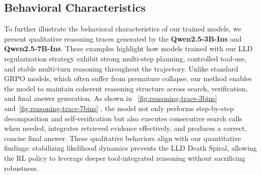 
\subsection{Behavioral Characteristics}
To further illustrate the behavioral characteristics of our trained models, we present qualitative reasoning traces generated by the \textbf{Qwen2.5-3B-Ins} and \textbf{Qwen2.5-7B-Ins}. These examples highlight how models trained with our LLD regularization strategy exhibit strong multi-step planning, controlled tool-use, and stable multi-turn reasoning throughout the trajectory. Unlike standard GRPO models, which often suffer from premature collapse, our method enables the model to maintain coherent reasoning structure across search, verification, and final answer generation. As shown in ~\cref{fig:reasoning-trace-3bins} and~\cref{fig:reasoning-trace-7bins} , the model not only performs step-by-step decomposition and self-verification but also executes consecutive search calls when needed, integrates retrieved evidence effectively, and produces a correct, concise final answer. These qualitative behaviors align with our quantitative findings: stabilizing likelihood dynamics prevents the LLD Death Spiral, allowing the RL policy to leverage deeper tool-integrated reasoning without sacrificing robustness.

